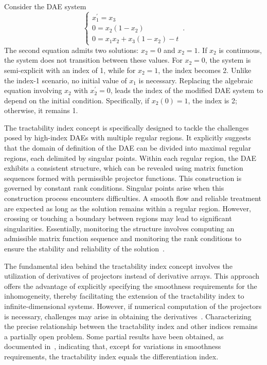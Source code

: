 \begin{example}
  Consider the \ac{DAE} system
  \begin{equation*}
    \begin{cases}
    x_1^{\prime} = x_3 \\
    0 = x_2(1 - x_2) \\
    0 = x_1x_2 + x_3(1 - x_2) - t
    \end{cases} \, \text{.}
  \end{equation*}
  The second equation admits two solutions: $x_2 = 0$ and $x_2 = 1$. If $x_2$ is continuous, the system does not transition between these values. For $x_2 = 0$, the system is semi-explicit with an index of 1, while for $x_2 = 1$, the index becomes 2. Unlike the index-1 scenario, no initial value of $x_1$ is necessary. Replacing the algebraic equation involving $x_2$ with $x_2^{\prime} = 0$, leads the index of the modified \ac{DAE} system to depend on the initial condition. Specifically, if $x_2(0) = 1$, the index is 2; otherwise, it remains 1.
\end{example}

The tractability index concept is specifically designed to tackle the challenges posed by high-index \acp{DAE} with multiple regular regions. It explicitly suggests that the domain of definition of the \ac{DAE} can be divided into maximal regular regions, each delimited by singular points. Within each regular region, the \ac{DAE} exhibits a consistent structure, which can be revealed using matrix function sequences formed with permissible projector functions. This construction is governed by constant rank conditions. Singular points arise when this construction process encounters difficulties. A smooth flow and reliable treatment are expected as long as the solution remains within a regular region. However, crossing or touching a boundary between regions may lead to significant singularities. Essentially, monitoring the structure involves computing an admissible matrix function sequence and monitoring the rank conditions to ensure the stability and reliability of the solution~\cite{lamour2011computational}.

The fundamental idea behind the tractability index concept involves the utilization of derivatives of projectors instead of derivative arrays. This approach offers the advantage of explicitly specifying the smoothness requirements for the inhomogeneity, thereby facilitating the extension of the tractability index to infinite-dimensional systems. However, if numerical computation of the projectors is necessary, challenges may arise in obtaining the derivatives~\cite{mehrmann2015index}. Characterizing the precise relationship between the tractability index and other indices remains a partially open problem. Some partial results have been obtained, as documented in~\cite{campbell1995index, campbell1995solvability, marz2005characterizing}, indicating that, except for variations in smoothness requirements, the tractability index equals the differentiation index.

